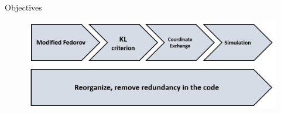\documentclass[11pt,t]{beamer}
\begin{document}
\begin{frame}[c]{Objectives}
	\begin{figure}
		\centering
		\includegraphics[scale = .6]{mygraphics/Objectives1.png}
	\end{figure}
\end{frame}
\end{document}
